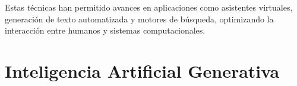 Estas técnicas han permitido avances en aplicaciones como asistentes virtuales, generación de texto automatizada y motores de búsqueda, optimizando la interacción entre humanos y sistemas computacionales.






\section{Inteligencia Artificial Generativa}






